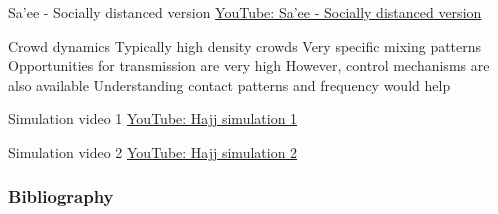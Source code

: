 \documentclass[aspectratio=169]{beamer}\usepackage[]{graphicx}\usepackage[]{xcolor}
\begin{document}
\begin{frame}{Sa'ee - Socially distanced version}
\bbullet \href{https://www.youtube.com/embed/JVges7Q2Mow}{YouTube: Sa'ee - Socially distanced version}
\end{frame}

\begin{frame}{Crowd dynamics}
\bbullet Typically high density crowds
\bbullet Very specific mixing patterns
\bbullet Opportunities for transmission are very high
\bbullet However, control mechanisms are also available
\bbullet Understanding contact patterns and frequency would help
\end{frame}




\begin{frame}{Simulation video 1}
\bbullet \href{https://www.youtube.com/embed/_oOf4uNIghw?loop=1&modestbranding=1&origin=https://julien-arino.github.io/&rel=0}{YouTube: Hajj simulation 1}
\end{frame}

\begin{frame}{Simulation video 2}
\bbullet \href{https://www.youtube.com/embed/qcWBi17qKnU?start=9&loop=1&modestbranding=1&origin=https://julien-arino.github.io/&rel=0}{YouTube: Hajj simulation 2}
\end{frame}




\begin{frame}[allowframebreaks]
\frametitle{Bibliography}


\end{frame}
\end{document}
